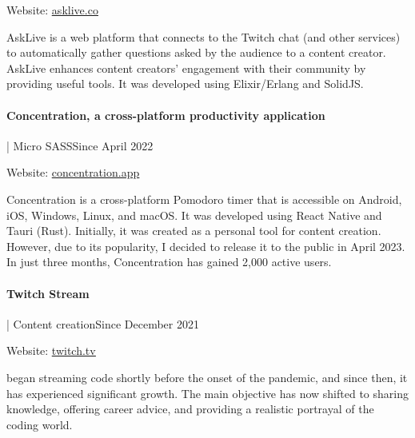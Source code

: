 \documentclass{article}
\begin{document}
Website: \href{https://asklive.co}{\underline{asklive.co}}

\vspace{\baselineskip}

AskLive is a web platform that connects to the Twitch chat (and other services) to automatically gather questions asked by the audience to a content creator. AskLive enhances content creators' engagement with their community by providing useful tools. It was developed using Elixir/Erlang and SolidJS.



\paragraph{Concentration, a cross-platform productivity application}  | Micro SASS\hspace*{\fill}Since April 2022

Website: \href{https://concentration.app}{\underline{concentration.app}}

\vspace{\baselineskip}

Concentration is a cross-platform Pomodoro timer that is accessible on Android, iOS, Windows, Linux, and macOS. It was developed using React Native and Tauri (Rust). Initially, it was created as a personal tool for content creation. However, due to its popularity, I decided to release it to the public in April 2023. In just three months, Concentration has gained 2,000 active users.

\vspace{\baselineskip}

\paragraph{Twitch Stream} | Content creation\hspace*{\fill}Since December 2021

Website: \href{https://twitch.tv/llcoolchris_}{\underline{twitch.tv}}

\vspace{\baselineskip}

 began streaming code shortly before the onset of the pandemic, and since then, it has experienced significant growth. The main objective has now shifted to sharing knowledge, offering career advice, and providing a realistic portrayal of the coding world.

\vspace{2ex}
\hrulefill
\end{document}
